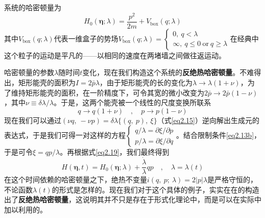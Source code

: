 系统的哈密顿量为
\begin{equation}
     H_{0}(\bm{\eta} ; \lambda)=\frac{p^{2}}{2 m}+V_{\mathrm{box}}(q ; \lambda)
        \label{eq2.18}
\end{equation}
其中$V_{\mathrm{box}}(q ; \lambda)$代表一维盒子的势场$V_{\mathrm{box}}(q ; \lambda) = \left\{\begin{array}{l} 0 ,\ q<\lambda\\ \infty ,\ q \leq 0\ \text{or}\ q \geq \lambda \end{array}\right.$在经典中这个粒子的运动是平凡的——以相同的速度在两堵墙之间做往返运动。
    
哈密顿量的参数$\lambda$随时间$t$变化，现在我们构造这个系统的\textbf{反绝热哈密顿量}。不难得出，矩形能壳的面积为$I=2 \bar{p} \lambda$，由于矩形能壳的长的变化为$\lambda \to \lambda(1+\nu)$，为了维持矩形能壳的面积，在一阶精度下，可令其宽的微小改变为$2 \bar{p} \to 2 \bar{p} (1-\nu)$，其中$\nu \equiv \delta \lambda / \lambda$。于是，这两个能壳被一个线性的尺度变换所联系
\begin{equation}
    q \rightarrow q(1+\nu) \quad, \quad p \rightarrow p(1-\nu)
    \label{eq2.19}
\end{equation}
现在我们可以通过$(\nu q,\ -\nu p)  = \delta \lambda \{ (q,\ p),\ \xi \}$（式\eqref{eq2.15}）逆向解出生成元的表达式，于是我们可得一对这样的方程$\left\{ \begin{array}{l} q / \lambda=\partial \xi / \partial p \\ p / \lambda=\partial \xi / \partial q \end{array}\right.$。结合限制条件\eqref{eq2.13b}，于是可令$\xi = q p / \lambda$。再根据式\eqref{eq2.19}，我们最终得到
\begin{equation}
    H(\bm{\eta}, t)=H_{0}(\bm{\eta} ; \lambda)+\frac{\dot{\lambda}}{\lambda} q p \quad, \quad \lambda=\lambda(t)
    \label{eq2.20}
\end{equation}
在这个时间依赖的哈密顿量之下，绝热不变量$i(q,\ p;\ \lambda)=2 |p| \lambda$是严格守恒的，不论函数$\lambda(t)$的形式是怎样的。现在我们对于这个具体的例子，实实在在的构造出了\textbf{反绝热哈密顿量}，这说明其并不只是存在于形式化理论中，而是可以在实际中加以利用的。

